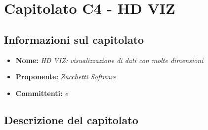 \section{Capitolato C4 - HD VIZ}
\subsection{Informazioni sul capitolato}
\begin{itemize}
	\item \textbf{Nome:} \textit{HD VIZ: visualizzazione di dati con molte dimensioni}
	\item \textbf{Proponente:} \textit{Zucchetti Software}
	\item \textbf{Committenti:} \textit{\VT{} e \CR{}}
\end{itemize}

\subsection{Descrizione del capitolato}
